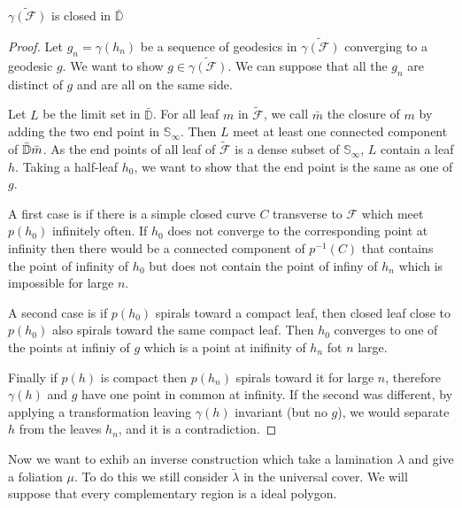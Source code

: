 \begin{lem}
$\tilde{\gamma(\mathcal{F})}$ is closed in $\bar{\mathbb{D}}$
\end{lem}

\begin{proof}

Let $g_n=\gamma(h_n)$ be a sequence of geodesics in $\tilde{\gamma(\mathcal{F})}$ converging to a geodesic $g$. We want to show $g \in \tilde{\gamma(\mathcal{F})}$. We can suppose that all the $g_n$ are distinct of $g$ and are all on the same side.

\smallbreak
Let $L$ be the limit set in $\bar{\mathbb{D}}$. For all leaf $m$ in $\tilde{\mathcal{F}}$, we call $\bar{m}$ the closure of $m$
 by adding the two end point in $\mathbb{S}_{\infty}$. Then $L$ meet at least one connected component of $\bar{\mathbb{D}} \\ \bar{m} $. As the end points of all leaf of $\tilde{\mathcal{F}}$ is a dense subset of $\mathbb{S}_{\infty}$, $L$ contain a leaf $h$. Taking a half-leaf $h_0$, we want to show that the end point is the same as one of $g$.

\smallbreak
A first case is if there is a simple closed curve $C$  transverse to $\mathcal{F}$ which meet $p(h_0)$ infinitely often. If $h_0$ does not converge to the corresponding point at infinity then there would be a connected component of $p^{-1}(C)$ that contains the point of infinity of $h_0$ but does not contain the point of infiny of $h_n$ which is impossible for large $n$.

\smallbreak
A second case is if $p(h_0)$ spirals toward a compact leaf, then closed leaf close to $p(h_0)$ also spirals toward the same compact leaf. Then $h_0$ converges to one of the points at infiniy of $g$ which is a point at inifinity of $h_n$ fot $n$ large.
\smallbreak

Finally if $p(h)$ is compact then $p(h_n)$ spirals toward it for large $n$, therefore $\gamma(h)$ and $g$ have one point in common at infinity. If the second was different, by applying a transformation leaving $\gamma(h)$ invariant (but no $g$), we would separate $h$ from the leaves $h_n$, and it is a contradiction.

\end{proof}

Now we want to exhib an inverse construction which take a lamination $\lambda$ and give a foliation $\mu$. To do this we still consider $\tilde{\lambda}$ in the universal cover. We will suppose that every complementary region is a ideal polygon.

